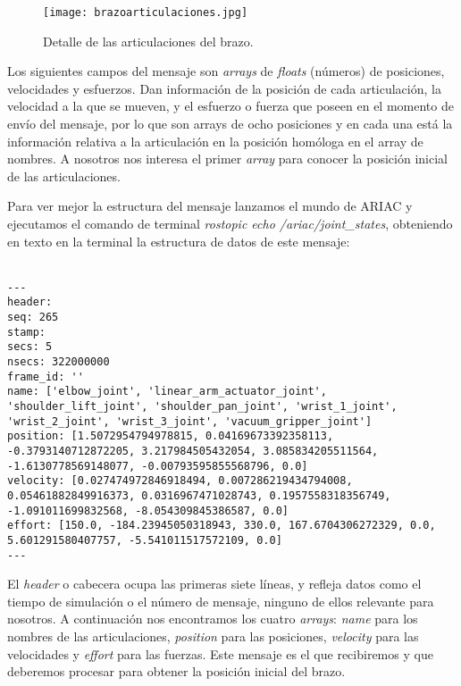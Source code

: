 \begin{figure}[]
	\centering\texttt{[image: brazoarticulaciones.jpg]}
	\caption{Detalle de las articulaciones del brazo.}
	\label{fig:brazoarticulaciones}
\end{figure}

Los siguientes campos del mensaje son \textit{arrays} de \textit{floats} (números) de posiciones, velocidades y esfuerzos. Dan información de la posición de cada articulación, la velocidad a la que se mueven, y el esfuerzo o fuerza que poseen en el momento de envío del mensaje, por lo que son arrays de ocho posiciones y en cada una está la información relativa a la articulación en la posición homóloga en el array de nombres. A nosotros nos interesa el primer \textit{array} para conocer la posición inicial de las articulaciones.

Para ver mejor la estructura del mensaje lanzamos el mundo de ARIAC y ejecutamos el comando de terminal \textit{rostopic echo /ariac/joint\_states}, obteniendo en texto en la terminal la estructura de datos de este mensaje:
\\
\\
\begin{lstlisting}
---
header: 
seq: 265
stamp: 
secs: 5
nsecs: 322000000
frame_id: ''
name: ['elbow_joint', 'linear_arm_actuator_joint', 'shoulder_lift_joint', 'shoulder_pan_joint', 'wrist_1_joint', 'wrist_2_joint', 'wrist_3_joint', 'vacuum_gripper_joint']
position: [1.5072954794978815, 0.04169673392358113, -0.3793140712872205, 3.217984505432054, 3.085834205511564, -1.6130778569148077, -0.00793595855568796, 0.0]
velocity: [0.027474972846918494, 0.007286219434794008, 0.05461882849916373, 0.0316967471028743, 0.1957558318356749, -1.091011699832568, -8.054309845386587, 0.0]
effort: [150.0, -184.23945050318943, 330.0, 167.6704306272329, 0.0, 5.601291580407757, -5.541011517572109, 0.0]
---
\end{lstlisting}

El \textit{header} o cabecera ocupa las primeras siete líneas, y refleja datos como el tiempo de simulación o el número de mensaje, ninguno de ellos relevante para nosotros. A continuación nos encontramos los cuatro \textit{arrays}: \textit{name} para los nombres de las articulaciones, \textit{position} para las posiciones, \textit{velocity} para las velocidades y \textit{effort} para las fuerzas. Este mensaje es el que recibiremos y que deberemos procesar para obtener la posición inicial del brazo.

